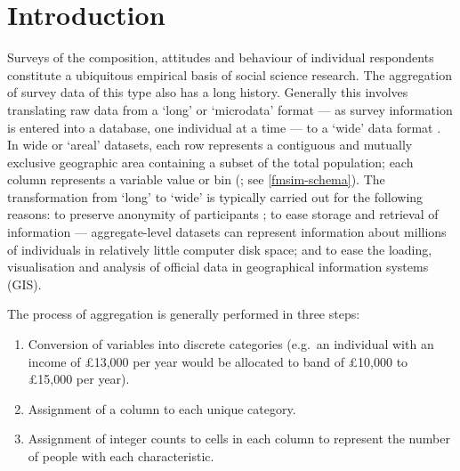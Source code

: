 \documentclass[a4paper,10pt]{article}
\begin{document}
\section{Introduction}
Surveys of the composition, attitudes and behaviour of individual
respondents constitute a ubiquitous empirical basis of social science research.
The aggregation of survey data of this type also has a long history.
Generally this involves translating raw data from a `long' or `microdata' format
--- as survey information is entered into a database,
one individual at a time ---
to a `wide' data format \citep{van2012flexible}. In wide or `areal' datasets,
each row represents a contiguous and mutually exclusive geographic area
containing a subset of the total population; each column represents a
variable value or bin (\citealp{Openshaw1983}; see \cref{fmsim-schema}).
The transformation from `long' to `wide' is typically carried out
for the following reasons: to preserve anonymity of participants \citep{Lee2009,marsh1993};
to ease storage and retrieval of information ---
 aggregate-level datasets can represent information about millions of individuals
in relatively little computer disk space; and to ease the loading, visualisation and
 analysis of official data in geographical information systems (GIS).

The process of aggregation is generally performed in three steps:  %
\begin{enumerate}
 \item Conversion of
variables into discrete categories (e.g.~an individual with an income of £13,000 per year
would be allocated to band of £10,000 to £15,000 per year).
 \item Assignment of a column to each unique category.
 \item Assignment of
integer counts to cells in each column to represent the number of people with each characteristic.
\end{enumerate}
\end{document}

